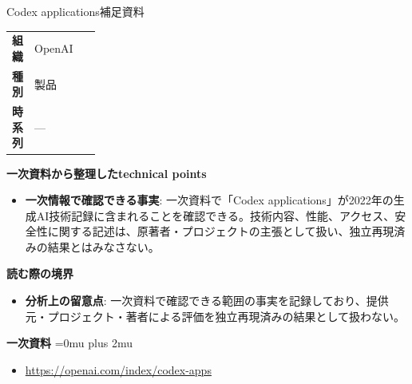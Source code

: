 \begin{technicalnote}{Codex applications}{補足資料}
\begingroup
\begin{tabularx}{\linewidth}{@{}>{\bfseries}p{0.22\linewidth}X@{}}
組織 & OpenAI \\
種別 & 製品 \\
時系列 & — \\
\end{tabularx}
\smallskip
{\bfseries 一次資料から整理したtechnical points}
\begin{itemize}[leftmargin=1.5em,itemsep=0.35em]
\item \textbf{一次情報で確認できる事実}: 一次資料で「Codex applications」が2022年の生成AI技術記録に含まれることを確認できる。技術内容、性能、アクセス、安全性に関する記述は、原著者・プロジェクトの主張として扱い、独立再現済みの結果とはみなさない。
\end{itemize}
\begin{minipage}{\linewidth}
{\bfseries 読む際の境界}
\begin{itemize}[leftmargin=1.5em,itemsep=0.35em]
\item \textbf{分析上の留意点}: 一次資料で確認できる範囲の事実を記録しており、提供元・プロジェクト・著者による評価を独立再現済みの結果として扱わない。
\end{itemize}
\begin{samepage}
{\bfseries 一次資料}
\begingroup\sloppy
\Urlmuskip=0mu plus 2mu\relax
\begin{itemize}[leftmargin=1.5em,itemsep=0.25em]
\item {\scriptsize\url{https://openai.com/index/codex-apps}}
\end{itemize}
\endgroup
\end{samepage}
\end{minipage}
\endgroup
\end{technicalnote}
\medskip

